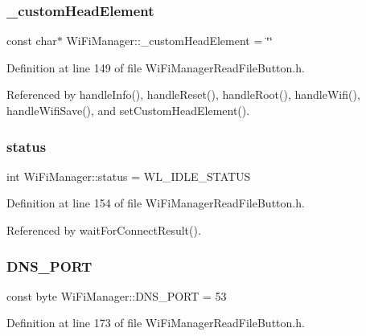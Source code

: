 \subsubsection{\texorpdfstring{\+\_\+custom\+Head\+Element}{\_customHeadElement}}
{\footnotesize\ttfamily const char$\ast$ Wi\+Fi\+Manager\+::\+\_\+custom\+Head\+Element = \char`\"{}\char`\"{}\hspace{0.3cm}{\ttfamily [private]}}



Definition at line 149 of file Wi\+Fi\+Manager\+Read\+File\+Button.\+h.



Referenced by handle\+Info(), handle\+Reset(), handle\+Root(), handle\+Wifi(), handle\+Wifi\+Save(), and set\+Custom\+Head\+Element().

\mbox{\label{class_wi_fi_manager_acceea0054a30c18809b34151d4e9eb0b}} 
\subsubsection{\texorpdfstring{status}{status}}
{\footnotesize\ttfamily int Wi\+Fi\+Manager\+::status = W\+L\+\_\+\+I\+D\+L\+E\+\_\+\+S\+T\+A\+T\+US\hspace{0.3cm}{\ttfamily [private]}}



Definition at line 154 of file Wi\+Fi\+Manager\+Read\+File\+Button.\+h.



Referenced by wait\+For\+Connect\+Result().

\mbox{\label{class_wi_fi_manager_ad0be1f49d4d59067c3d96ae47b061f7f}} 
\subsubsection{\texorpdfstring{D\+N\+S\+\_\+\+P\+O\+RT}{DNS\_PORT}}
{\footnotesize\ttfamily const byte Wi\+Fi\+Manager\+::\+D\+N\+S\+\_\+\+P\+O\+RT = 53\hspace{0.3cm}{\ttfamily [private]}}



Definition at line 173 of file Wi\+Fi\+Manager\+Read\+File\+Button.\+h.



